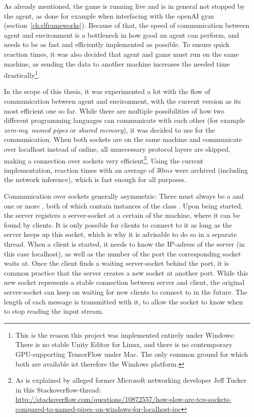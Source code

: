As already mentioned, the game is running live and is in general not stopped by the agent, as done for example when interfacing with the openAI gym (section~\ref{ch:rlframeworks}). Because of that, the speed of communication between agent and environment is a bottleneck in how good an agent can perform, and needs to be as fast and efficiently implemented as possible. To ensure quick reaction times, it was also decided that agent and game must run on the same machine, as sending the data to another machine increases the needed time drastically\footnote{This is the reason this project was implemented entirely under Windows: There is no stable Unity Editor for Linux, and there is no contemporary GPU-supporting TensorFlow under Mac. The only common ground for which both are available ist therefore the Windows platform.}.

In the scope of this thesis, it was experimented a lot with the flow of communication between agent and environment, with the current version as its most efficient one so far. While there are multiple possibilities of how two different programming languages can communicate with each other (for example \textit{zero-mq}, \textit{named pipes} or \textit{shared memory}), it was decided to use  for the communication. When both sockets are on the same machine and communicate over localhost instead of online, all unnecessary protocol layers are skipped, making a connection over sockets very efficient\footnote{As is explained by alleged former Microsoft networking developer Jeff Tucker in this Stackoverflow-thread: \href{http://stackoverflow.com/questions/10872557/how-slow-are-tcp-sockets-compared-to-named-pipes-on-windows-for-localhost-ipc}{http://stackoverflow.com/questions/10872557/how-slow-are-tcp-sockets-compared-to-named-pipes\,-on-windows-for-localhost-ipc}}. Using the current implementation, reaction times with an average of $30ms$ were archived (including the network inference), which is fast enough for all purposes.

Communication over sockets generally asymmetric: There must always be a  and one or more , both of which contain instances of the class . Upon being started, the server registers a server-socket at a certain  of the machine, where it can be found by clients. It is only possible for clients to connect to it as long as the server keeps up this socket, which is why it is advisable to do so in a separate thread. When a client is started, it needs to know the IP-adress of the server (in this case localhost), as well as the number of the port the corresponding socket waits at. Once the client finds a waiting server-socket behind the port, it is common practice that the server creates a new socket at another port. While this new socket represents a stable connection between server and client, the original server-socket can keep on waiting for new clients to connect to in the future. The length of each message is transmitted with it, to allow the socket to know when to stop reading the input stream.

